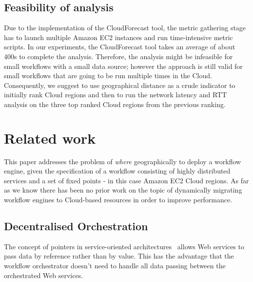 \documentclass[10pt, conference, compsocconf]{IEEEtran}
\newcommand{\sysname}{CloudForecast\xspace}
\begin{document}
\subsection{Feasibility of analysis}
Due to the implementation of the \sysname tool, the metric gathering stage has to launch multiple Amazon EC2 instances and run time-intensive metric scripts. In our experiments, the \sysname tool takes an average of about 400s to complete the analysis. Therefore, the analysis might be infeasible for small workflows with a small data source; however the approach is still valid for small workflows that are going to be run multiple times in the Cloud. Consequently, we suggest to use geographical distance as a crude indicator to initially rank Cloud regions and then to run the network latency and RTT analysis on the three top ranked Cloud regions from the previous ranking.



















\section{Related work}
\label{sec:related}

This paper addresses the problem of \emph{where} geographically to deploy a workflow engine, given the specification of a workflow consisting of highly distributed services and a set of fixed points - in this case Amazon EC2 Cloud regions. As far as we know there has been no prior work on the topic of dynamically migrating workflow engines to Cloud-based resources in order to improve performance.




\subsection{Decentralised Orchestration} \label{section:dag_tools}



The concept of pointers in service-oriented architectures~\cite{soa_pointers} allows Web services to pass data by reference rather than by value. This has the advantage that the workflow orchestrator doesn't need to handle all data passing between the orchestrated Web services.
\end{document}

